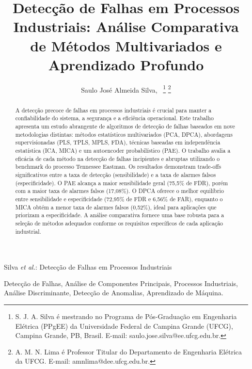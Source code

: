 \documentclass[journal]{IEEEtran}
\begin{document}
\title{Detecção de Falhas em Processos Industriais: Análise Comparativa de Métodos Multivariados e Aprendizado Profundo}

\author{Saulo José Almeida Silva,~
\thanks{S. J. A. Silva é mestrando no Programa de Pós-Graduação em Engenharia Elétrica (PPgEE) da Universidade Federal de Campina Grande (UFCG), Campina Grande, PB, Brasil. E-mail: saulo.jose.silva@ee.ufcg.edu.br.}
\thanks{A. M. N. Lima é Professor Titular do Departamento de Engenharia Elétrica da UFCG. E-mail: amnlima@dee.ufcg.edu.br.}}

%
{Silva \MakeLowercase{\textit{et al.}}: Detecção de Falhas em Processos Industriais}

\maketitle


\begin{abstract}
A detecção precoce de falhas em processos industriais é crucial para manter a confiabilidade do sistema, a segurança e a eficiência operacional. Este trabalho apresenta um estudo abrangente de algoritmos de detecção de falhas baseados em nove metodologias distintas: métodos estatísticos multivariados (PCA, DPCA), abordagens supervisionadas (PLS, TPLS, MPLS, FDA), técnicas baseadas em independência estatística (ICA, MICA) e um autoencoder probabilístico (PAE). O trabalho avalia a eficácia de cada método na detecção de falhas incipientes e abruptas utilizando o benchmark do processo Tennessee Eastman. Os resultados demonstram trade-offs significativos entre a taxa de detecção (sensibilidade) e a taxa de alarmes falsos (especificidade). O PAE alcança a maior sensibilidade geral (75,5\% de FDR), porém com a maior taxa de alarmes falsos (17,08\%). O DPCA oferece o melhor equilíbrio entre sensibilidade e especificidade (72,95\% de FDR e 6,56\% de FAR), enquanto o MICA obtém a menor taxa de alarmes falsos (0,52\%), ideal para aplicações que priorizam a especificidade. A análise comparativa fornece uma base robusta para a seleção de métodos adequados conforme os requisitos específicos de cada aplicação industrial.
\end{abstract}

\begin{IEEEkeywords}
Detecção de Falhas, Análise de Componentes Principais, Processos Industriais, Análise Discriminante, Detecção de Anomalias, Aprendizado de Máquina.
\end{IEEEkeywords}
\end{document}
